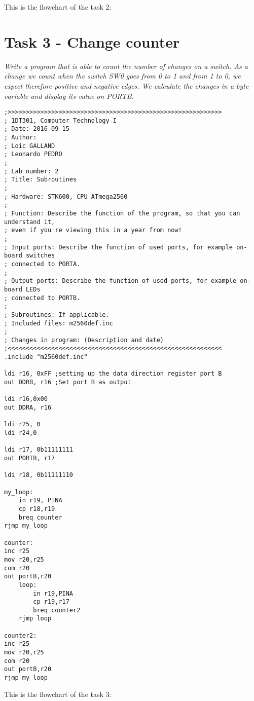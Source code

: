 \documentclass[a4paper,12pt]{article}
\begin{document}
\newpage
This is the flowchart of the task 2:
\begin{center}
\end{center}


\section{Task 3 - Change counter}
\textit{Write a program that is able to count the number of changes on a switch. As a change we count
when the switch SW0 goes from 0 to 1 and from 1 to 0, we expect therefore positive and negative
edges. We calculate the changes in a byte variable and display its value on PORTB.}

\lstset{style=Asm}
\begin{lstlisting}
;>>>>>>>>>>>>>>>>>>>>>>>>>>>>>>>>>>>>>>>>>>>>>>>>>>>>>>>>>>>
; 1DT301, Computer Technology I
; Date: 2016-09-15
; Author:
; Loic GALLAND
; Leonardo PEDRO
;
; Lab number: 2
; Title: Subroutines
;
; Hardware: STK600, CPU ATmega2560
;
; Function: Describe the function of the program, so that you can understand it,
; even if you're viewing this in a year from now!
;
; Input ports: Describe the function of used ports, for example on-board switches
; connected to PORTA.
;
; Output ports: Describe the function of used ports, for example on-board LEDs
; connected to PORTB.
;
; Subroutines: If applicable.
; Included files: m2560def.inc
;
; Changes in program: (Description and date)
;<<<<<<<<<<<<<<<<<<<<<<<<<<<<<<<<<<<<<<<<<<<<<<<<<<<<<<<<<<<
.include "m2560def.inc"

ldi r16, 0xFF ;setting up the data direction register port B
out DDRB, r16 ;Set port B as output

ldi r16,0x00
out DDRA, r16

ldi r25, 0
ldi r24,0

ldi r17, 0b11111111
out PORTB, r17

ldi r18, 0b11111110

my_loop:
	in r19, PINA
	cp r18,r19
	breq counter
rjmp my_loop

counter:
inc r25
mov r20,r25
com r20
out portB,r20
	loop:
		in r19,PINA
		cp r19,r17
		breq counter2
	rjmp loop

counter2:
inc r25
mov r20,r25
com r20
out portB,r20
rjmp my_loop
\end{lstlisting}

\newpage
This is the flowchart of the task 3:
\begin{center}
\end{center}
\end{document}
